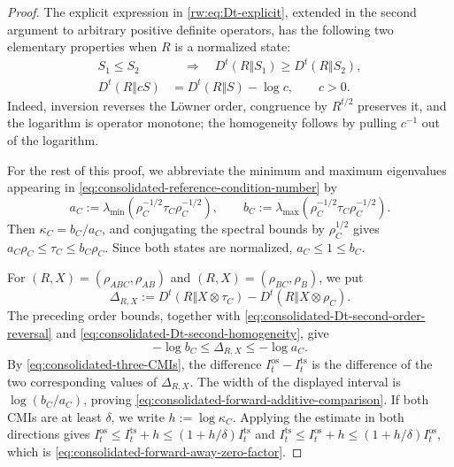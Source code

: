 \documentclass[11pt]{article}
\theoremstyle{remark}
\DeclareMathOperator{\os}{os}
\DeclareMathOperator{\ts}{ts}
\newcommand{\1}{\mathbbm{1}}
\begin{document}
\begin{proof}
The explicit expression in \eqref{rw:eq:Dt-explicit}, extended in
the second argument to arbitrary positive definite operators, has
the following two elementary properties when $R$ is a normalized
state:
\begin{align}
 S_1\leq S_2
 &\quad\Longrightarrow\quad
 D^t(R\Vert S_1)\geq D^t(R\Vert S_2),
 \label{eq:consolidated-Dt-second-order-reversal}\\
 D^t(R\Vert cS)&=D^t(R\Vert S)-\log c,
 \qquad c>0.
 \label{eq:consolidated-Dt-second-homogeneity}
\end{align}
Indeed, inversion reverses the L\"owner order, congruence by
$R^{t/2}$ preserves it, and the logarithm is operator monotone; the
homogeneity follows by pulling $c^{-1}$ out of the logarithm.

For the rest of this proof, we abbreviate the minimum and maximum
eigenvalues appearing in
\eqref{eq:consolidated-reference-condition-number} by
\begin{equation*}
 a_C:=\lambda_{\min}
 \!\left(\rho_C^{-1/2}\tau_C\rho_C^{-1/2}\right),
 \qquad
 b_C:=\lambda_{\max}
 \!\left(\rho_C^{-1/2}\tau_C\rho_C^{-1/2}\right).
\end{equation*}
Then $\kappa_C=b_C/a_C$, and conjugating the spectral bounds by
$\rho_C^{1/2}$ gives
$a_C\rho_C\leq\tau_C\leq b_C\rho_C$.  Since both states are
normalized, $a_C\leq1\leq b_C$.

For $(R,X)=(\rho_{ABC},\rho_{AB})$ and
$(R,X)=(\rho_{BC},\rho_B)$, we put
\begin{equation}
 \Delta_{R,X}:=
 D^t(R\Vert X\otimes\tau_C)
 -D^t(R\Vert X\otimes\rho_C).
\end{equation}
The preceding order bounds, together with
\eqref{eq:consolidated-Dt-second-order-reversal} and
\eqref{eq:consolidated-Dt-second-homogeneity}, give
\begin{equation}
 -\log b_C\leq\Delta_{R,X}\leq-\log a_C.
\end{equation}
By \eqref{eq:consolidated-three-CMIs}, the difference
$I_t^{\os}-I_t^{\ts}$ is the difference of the two corresponding
values of $\Delta_{R,X}$.  The width of the displayed interval is
$\log(b_C/a_C)$, proving
\eqref{eq:consolidated-forward-additive-comparison}.
If both CMIs are at least $\delta$, we write $h:=\log\kappa_C$.  Applying
the estimate in both directions gives
$I_t^{\os}\leq I_t^{\ts}+h\leq(1+h/\delta)I_t^{\ts}$ and
$I_t^{\ts}\leq I_t^{\os}+h\leq(1+h/\delta)I_t^{\os}$, which is
\eqref{eq:consolidated-forward-away-zero-factor}.
\end{proof}
\end{document}
